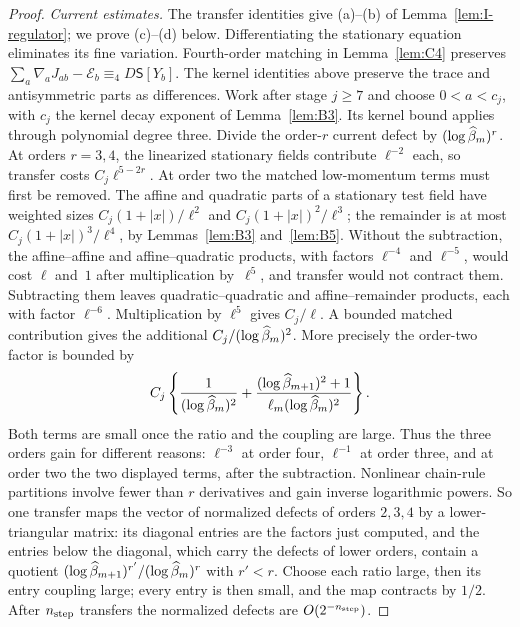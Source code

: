 \begin{proof}
\emph{Current estimates.} The transfer identities give (a)--(b) of Lemma~\ref{lem:I-regulator}; we prove (c)--(d) below. Differentiating the stationary equation eliminates its fine variation. Fourth-order matching in Lemma~\ref{lem:C4} preserves $\sum_a\nabla_aJ_{ab}-\mathcal E_b\equiv_4D\mathsf S[Y_b]$. The kernel identities above preserve the trace and antisymmetric parts as differences.
Work after stage $j\ge7$ and choose $0<a<c_j$, with $c_j$ the kernel decay exponent of Lemma~\ref{lem:B3}. Its kernel bound applies through polynomial degree three. Divide the order-$r$ current defect by $(\log\widehat{\beta}_m)^r$. At orders $r=3,4$, the linearized stationary fields contribute $\ell^{-2}$ each, so transfer costs $C_j\ell^{5-2r}$. At order two the matched low-momentum terms must first be removed. The affine and quadratic parts of a stationary test field have weighted sizes $C_j(1+|x|)/\ell^2$ and $C_j(1+|x|)^2/\ell^3$; the remainder is at most $C_j(1+|x|)^3/\ell^4$, by Lemmas~\ref{lem:B3} and~\ref{lem:B5}. Without the subtraction, the affine--affine and affine--quadratic products, with factors $\ell^{-4}$ and $\ell^{-5}$, would cost $\ell$ and~$1$ after multiplication by~$\ell^5$, and transfer would not contract them. Subtracting them leaves quadratic--quadratic and affine--remainder products, each with factor $\ell^{-6}$. Multiplication by $\ell^5$ gives $C_j/\ell$. A bounded matched contribution gives the additional $C_j/(\log\widehat{\beta}_m)^2$. More precisely the order-two factor is bounded by
\begin{equation*}
C_j\left\{\frac{1}{(\log\widehat{\beta}_m)^2}
+\frac{(\log\widehat{\beta}_{m+1})^2+1}{\ell_m(\log\widehat{\beta}_m)^2}\right\}.
\end{equation*}
Both terms are small once the ratio and the coupling are large. Thus the three orders gain for different reasons: $\ell^{-3}$ at order four, $\ell^{-1}$ at order three, and at order two the two displayed terms, after the subtraction. Nonlinear chain-rule partitions involve fewer than $r$ derivatives and gain inverse logarithmic powers. So one transfer maps the vector of normalized defects of orders $2,3,4$ by a lower-triangular matrix: its diagonal entries are the factors just computed, and the entries below the diagonal, which carry the defects of lower orders, contain a quotient $(\log\widehat{\beta}_{m+1})^{r'}/(\log\widehat{\beta}_m)^r$ with $r'<r$. Choose each ratio large, then its entry coupling large; every entry is then small, and the map contracts by $1/2$. After $n_{\rm step}$ transfers the normalized defects are $O(2^{-n_{\rm step}})$.


\end{proof}
